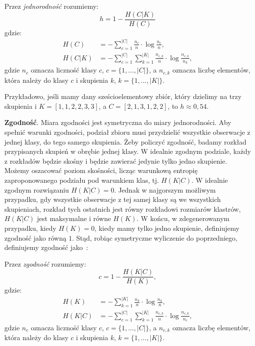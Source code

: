 \documentclass{praca1}
\begin{document}
\begin{definition}
Przez \emph{jednorodność} rozumiemy:
\begin{equation}
h = %
1 - \frac{H(C|K)}{H(C)} %
\end{equation}
gdzie:
\begin{align*}
H(C) & = - \sum\limits_{c = 1}^{|C|}\frac{n_c}{n}\cdot \log{\frac{n_c}{n}},  \\
H(C|K) & = - \sum\limits_{c = 1}^{|C|}\sum\limits_{k = 1}^{|K|}\frac{n_{c,k}}{n}\cdot \log{\frac{n_{c,k}}{n_k}},
\end{align*}
gdzie $n_c$ oznacza liczność klasy $c$, $c = \{1,\ldots, |C|\}$, a $n_{c,k}$ oznacza liczbę elementów, która należy do klasy $c$ i skupienia $k$, $k = \{1,\ldots, |K|\}$.
\end{definition}

Przykładowo, jeśli mamy dany sześcioelementowy zbiór, który dzielimy na trzy skupienia i $K = [1, 1, 2, 2, 3, 3]$, a $C = [2, 1, 3, 1, 2, 2]$, to $h \approx 0,54$.

\textbf{Zgodność}. Miara zgodności jest symetryczna do miary jednorodności. Aby spełnić warunki zgodności, podział zbioru musi przydzielić wszystkie obserwacje z jednej klasy, do tego samego skupienia. Żeby policzyć zgodność, badamy rozkład przypisanych skupień w obrębie jednej klasy. W idealnie zgodnym podziale, każdy z rozkładów będzie skośny i będzie zawierać jedynie tylko jedno skupienie. Możemy oszacować poziom skośności, licząc warunkową entropię zaproponowanego podziału pod warunkiem klas, tj. $H(K|C)$. W idealnie zgodnym rozwiązaniu $H(K|C) = 0$. Jednak w najgorszym możliwym przypadku, gdy wszystkie obserwacje z tej samej klasy są we wszystkich skupieniach, rozkład tych ostatnich jest równy rozkładowi rozmiarów klastrów, $H(K|C)$ jest maksymalne i równe $H(K)$. W końcu, w zdegenerowanym przypadku, kiedy $H(K) = 0$, kiedy mamy tylko jedno skupienie, definiujemy zgodność jako równą $1$. Stąd, robiąc symetryczne wyliczenie do poprzedniego, definiujemy zgodność jako~\cite{Rosenberg2007:vmeasure}:

\begin{definition}
Przez \emph{zgodność} rozumiemy:
\begin{equation}
c = %
1 - \frac{H(K|C)}{H(K)}, %
\end{equation}
gdzie:
\begin{align*}
H(K) & = - \sum\limits_{k = 1}^{|K|}\frac{n_k}{n}\cdot \log{\frac{n_k}{n}},  \\
H(K|C) & = - \sum\limits_{c = 1}^{|C|}\sum\limits_{k = 1}^{|K|}\frac{n_{c,k}}{n}\cdot \log{\frac{n_{c,k}}{n_c}},
\end{align*}
gdzie $n_c$ oznacza liczność klasy $c$, $c = \{1,\ldots, |C|\}$, a $n_{c,k}$ oznacza liczbę elementów, która należy do klasy $c$ i skupienia $k$, $k = \{1,\ldots, |K|\}$.
\end{definition}
\end{document}
